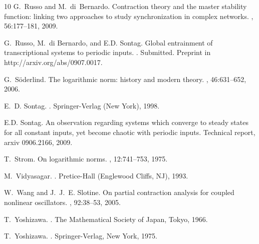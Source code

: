 \documentclass{svmult}
\newcommand{\edo}{\end{document}}
\begin{document}
\begin{thebibliography}{10}
G.~Russo and M.~di~Bernardo.
\newblock Contraction theory and the master stability function: linking two
  approaches to study synchronization in complex networks.
, 56:177--181, 2009.

G.~Russo, M.~{di Bernardo}, and E.D. Sontag.
\newblock Global entrainment of transcriptional systems to periodic inputs.
.
\newblock Submitted. Preprint in http://arxiv.org/abs/0907.0017.

G.~S\"oderlind.
\newblock The logarithmic norm: history and modern theory.
, 46:631--652, 2006.

E.~D. Sontag.
.
\newblock Springer-Verlag (New York), 1998.

E.D. Sontag.
\newblock An observation regarding systems which converge to steady states for
  all constant inputs, yet become chaotic with periodic inputs.
\newblock Technical report, arxiv 0906.2166, 2009.

T.~Strom.
\newblock On logarithmic norms.
, 12:741--753, 1975.

M.~Vidyasagar.
.
\newblock Pretice-Hall (Englewood Cliffs, NJ), 1993.

W.~Wang and J.~J.~E. Slotine.
\newblock On partial contraction analysis for coupled nonlinear oscillators.
, 92:38--53, 2005.

T.~Yoshizawa.
.
\newblock The Mathematical Society of Japan, Tokyo, 1966.

T.~Yoshizawa.
.
\newblock Springer-Verlag, New York, 1975.

\end{thebibliography}



\edo
\end{document}
